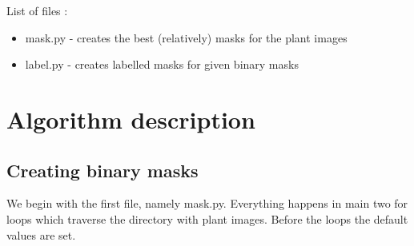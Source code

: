\documentclass[12pt]{article}
\begin{document}
List of files :
\begin{itemize}
\item mask.py - creates the best (relatively) masks for the plant images 
\item label.py - creates labelled masks for given binary masks
\end{itemize}

\newpage

\section{Algorithm description}


\subsection{Creating binary masks}

We begin with the first file, namely mask.py. Everything happens in main two for loops which traverse the directory with plant images. Before the loops the default values are set.
\end{document}
